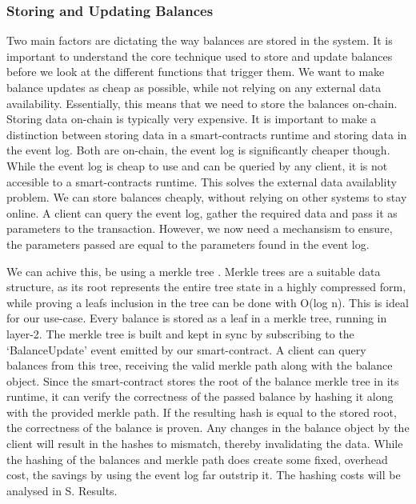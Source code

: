 \documentclass[../../thesis.tex]{subfiles}
\begin{document}
\subsubsection{Storing and Updating Balances} \label{balances}
Two main factors are dictating the way balances are stored in the system. It is important to understand the core technique used to store and update balances before we look at the different functions that trigger them. We want to make balance updates as cheap as possible, while not relying on any external data availability. Essentially, this means that we need to store the balances on-chain. Storing data on-chain is typically very expensive. It is important to make a distinction between storing data in a smart-contracts runtime and storing data in the event log. Both are on-chain, the event log is significantly cheaper though. While the event log is cheap to use and can be queried by any client, it is not accesible to a smart-contracts runtime. This solves the external data availablity problem. We can store balances cheaply, without relying on other systems to stay online. A client can query the event log, gather the required data and pass it as parameters to the transaction. However, we now need a mechansism to ensure, the parameters passed are equal to the parameters found in the event log. 

We can achive this, be using a merkle tree \cite{szydlo2004merkle}. Merkle trees are a suitable data structure, as its root represents the entire tree state in a highly compressed form, while proving a leafs inclusion in the tree can be done with O(log n). This is ideal for our use-case. Every balance is stored as a leaf in a merkle tree, running in layer-2. The merkle tree is built and kept in sync by subscribing to the `BalanceUpdate' event emitted by our smart-contract. A client can query balances from this tree, receiving the valid merkle path along with the balance object. Since the smart-contract stores the root of the balance merkle tree in its runtime, it can verify the correctness of the passed balance by hashing it along with the provided merkle path. If the resulting hash is equal to the stored root, the correctness of the balance is proven. Any changes in the balance object by the client will result in the hashes to mismatch, thereby invalidating the data. While the hashing of the balances and merkle path does create some fixed, overhead cost, the savings by using the event log far outstrip it. The hashing costs will be analysed in S. Results.
\end{document}

